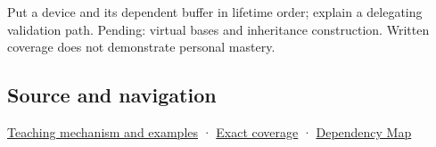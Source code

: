 Put a device and its dependent buffer in lifetime order; explain a delegating validation path. Pending: virtual bases and inheritance construction. Written coverage does not demonstrate personal mastery.

\subsection{Source and navigation}\label{appendix-3cb49709605a-source-and-navigation}

\hyperref[01-foundations-i-ch003-construction-order-records-lifetime-dependencies]{Teaching mechanism and examples} · \hyperref[appendix-fd090d982a15-m009---parts-127-147]{Exact coverage} · \hyperref[appendix-4ad47bdd269a]{Dependency Map}
